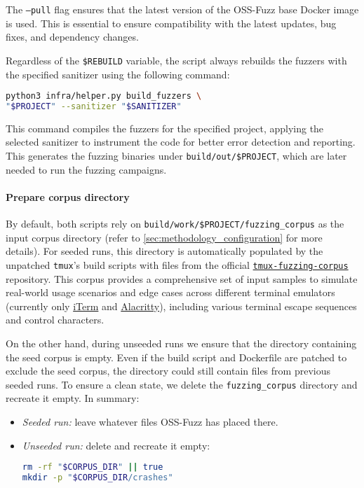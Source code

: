 The \texttt{---pull} flag ensures that the latest version of the OSS-Fuzz base Docker image is used. This is essential to ensure compatibility with the latest updates, bug fixes, and dependency changes.

Regardless of the \texttt{\$REBUILD} variable, the script always rebuilds the fuzzers with the specified sanitizer using the following command:

\begin{lstlisting}[language=bash, caption={OSS-Fuzz helper script command to build the project fuzzers with the specified sanitizer}]
python3 infra/helper.py build_fuzzers \
"$PROJECT" --sanitizer "$SANITIZER"
\end{lstlisting}

This command compiles the fuzzers for the specified project, applying the selected sanitizer to instrument the code for better error detection and reporting. This generates the fuzzing binaries under \texttt{build/out/\$PROJECT}, which are later needed to run the fuzzing campaigns.

\noindent \paragraph{Prepare corpus directory}

By default, both scripts rely on \texttt{build/work/\$PROJECT/fuzzing\_corpus} as the input corpus directory (refer to \autoref{sec:methodology_configuration} for more details). For seeded runs, this directory is automatically populated by the unpatched \texttt{tmux}'s build scripts with files from the official \href{https://github.com/tmux/tmux-fuzzing-corpus/}{\texttt{tmux-fuzzing-corpus}} repository. This corpus provides a comprehensive set of input samples to simulate real-world usage scenarios and edge cases across different terminal emulators (currently only \href{https://iterm2.com/}{iTerm} and \href{https://alacritty.org/}{Alacritty}), including various terminal escape sequences and control characters. \cite{tmux:tmux-fuzzing-corpus}

On the other hand, during unseeded runs we ensure that the directory containing the seed corpus is empty. Even if the build script and Dockerfile are patched to exclude the seed corpus, the directory could still contain files from previous seeded runs. To ensure a clean state, we delete the \texttt{fuzzing\_corpus} directory and recreate it empty. In summary:

\begin{itemize}
	\item \emph{Seeded run:} leave whatever files OSS-Fuzz has placed there.
	\item \emph{Unseeded run:} delete and recreate it empty:
	      \begin{lstlisting}[language=bash, caption=Bash commands used to setup an empty corpus directory for unseeded runs]
rm -rf "$CORPUS_DIR" || true
mkdir -p "$CORPUS_DIR/crashes"
\end{lstlisting}
\end{itemize}

